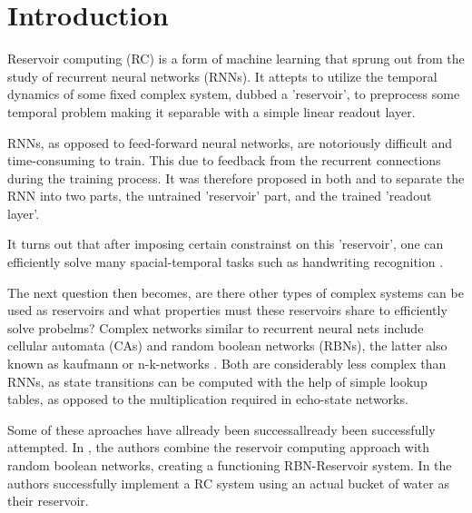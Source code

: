 \section{Introduction}

Reservoir computing (RC) is a form of machine learning that sprung out from the study of recurrent neural networks (RNNs).
It attepts to utilize the temporal dynamics of some fixed complex system, dubbed a 'reservoir',
to preprocess some temporal problem making it separable with a simple linear readout layer.

RNNs, as opposed to feed-forward neural networks,
are notoriously difficult and time-consuming to train.
This due to feedback from the recurrent connections during the training process.
It was therefore proposed in both \cite{jaeger2002adaptive} and 
to separate the RNN into two parts, the untrained 'reservoir' part, and the trained 'readout layer'.

It turns out that after imposing certain constrainst on this 'reservoir',
one can efficiently solve many spacial-temporal tasks such as handwriting recognition .

The next question then becomes, are there other types of complex systems can be used as reservoirs
and what properties must these reservoirs share to efficiently solve probelms?
Complex networks similar to recurrent neural nets include cellular automata (CAs) and random boolean networks (RBNs), the latter also known as kaufmann or n-k-networks .
Both are considerably less complex than RNNs, as state transitions can be computed with the help of simple lookup tables, as opposed to the multiplication required in echo-state networks.

Some of these aproaches have allready been successallready been successfully attempted.
In \cite{reservoir-rbn}, the authors combine the reservoir computing approach with random boolean networks, creating a functioning RBN-Reservoir system.
In \cite{fernando2003pattern} the authors successfully implement a RC system using an actual bucket of water as their reservoir.




